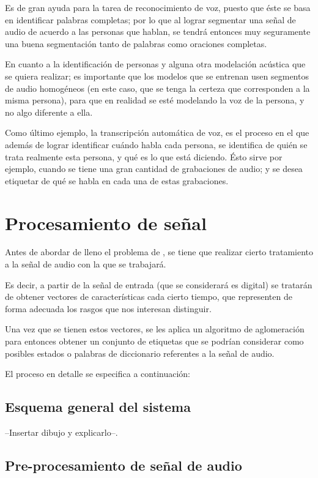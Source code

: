 Es de gran ayuda para la tarea de reconocimiento de voz, puesto que 
éste se basa en identificar palabras completas; por lo que al lograr segmentar una 
señal de audio de acuerdo a las personas que hablan, se tendrá entonces muy seguramente 
una buena segmentación tanto de palabras como oraciones completas.

En cuanto a la identificación de personas y alguna otra modelación acústica que se 
quiera realizar; es importante que los modelos que se entrenan usen segmentos de 
audio homogéneos (en este caso, que se tenga la certeza que corresponden a la misma 
persona), para que en realidad se esté modelando la voz de la persona, y no algo diferente
a ella.

Como último ejemplo, la transcripción automática de voz, es el proceso en el que además 
de lograr identificar cuándo habla cada persona, se identifica de quién se trata realmente 
esta persona, y qué es lo que está diciendo. Ésto sirve por ejemplo, cuando se tiene una 
gran cantidad de grabaciones de audio; y se desea etiquetar de qué se habla en cada una de 
estas grabaciones. 

\section{Procesamiento de señal}

Antes de abordar de lleno el problema de \sd, se tiene que 
realizar cierto tratamiento a la señal de audio con la que se trabajará. 

Es decir, a partir de la señal de entrada (que se considerará es digital) se 
tratarán de obtener vectores de características cada cierto tiempo,
que representen de forma adecuada los rasgos que nos interesan distinguir.

Una vez que se tienen estos vectores, se les aplica un algoritmo de aglomeración 
para entonces obtener un conjunto de etiquetas que se podrían considerar 
como posibles estados o palabras de diccionario referentes a la señal 
de audio.

El proceso en detalle se especifica a continuación: 

\subsection{Esquema general del sistema}

--Insertar dibujo y explicarlo--.

\subsection{Pre-procesamiento de señal de audio}


